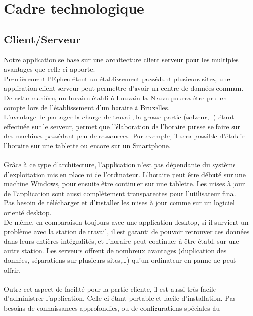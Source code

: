 
\chapter{Cadre technologique}

\section{Client/Serveur}
Notre application se base sur une architecture client serveur pour les multiples
avantages que celle-ci apporte.\\
Premièrement l'Ephec étant un établissement possédant plusieurs sites,
 une application client serveur peut permettre d'avoir un centre de données
 commun.
 De cette manière, un horaire établi à Louvain-la-Neuve pourra être pris en
 compte lors de l'établissement d'un horaire à Bruxelles.\\
L'avantage de partager la charge de travail, la grosse partie (solveur,…) étant
effectuée sur le serveur, permet que l'élaboration de l'horaire puisse se
faire sur des machines possédant peu de ressources. Par exemple, il sera
possible d'établir l'horaire sur une tablette ou encore sur un Smartphone.\\
\\
Grâce à ce type d'architecture, l'application n'est pas dépendante du système
d'exploitation mis en place ni de l'ordinateur. L'horaire peut être débuté sur
une machine Windows, pour ensuite être continuer sur une tablette.
Les mises à jour de l'application sont aussi complètement transparentes pour
l'utilisateur final. Pas besoin de télécharger et d'installer les mises à jour
comme sur un logiciel orienté desktop.\\
De même, en comparaison toujours avec une application desktop, si il survient un
problème avec la station de travail, il est garanti de pouvoir retrouver ces
données dans leurs entières intégralités, et l'horaire peut continuer à être établi
sur une autre station. Les serveurs offrent de nombreux avantages (duplication des
données, séparations sur plusieurs sites,…) qu'un ordinateur en panne ne peut offrir.\\
\\
Outre cet aspect de facilité pour la partie cliente, il est aussi très facile
d'administrer l'application. Celle-ci étant portable et facile d'installation.
Pas besoins de connaissances approfondies, ou de configurations spéciales du
